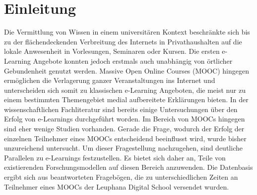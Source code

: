 \section{Einleitung}
\label{sec:einleitung}

Die Vermittlung von Wissen in einem universitären Kontext beschränkte sich bis zu der flächendeckenden Verbreitung des Internets in Privathaushalten auf die lokale Anwesenheit in Vorlesungen, Seminaren oder Kursen. Die ersten e-Learning Angebote konnten jedoch erstmals auch unabhängig von örtlicher Gebundenheit genutzt werden. Massive Open Online Courses (MOOC) hingegen ermöglichen die Verlagerung ganzer Veranstaltungen ins Internet und unterscheiden sich somit zu klassischen e-Learning Angeboten, die meist nur zu einem bestimmten Themengebiet medial aufbereitete Erklärungen bieten.
\newline
In der wissenschaftlichen Fachliteratur sind bereits einige Untersuchungen über den Erfolg von e-Learnings durchgeführt worden. Im Bereich von MOOCs hingegen sind eher wenige Studien vorhanden. Gerade die Frage, wodurch der Erfolg der einzelnen Teilnehmer eines MOOCs entscheidend beeinflusst wird, wurde bisher unzureichend untersucht. Um dieser Fragestellung nachzugehen, sind deutliche Parallelen zu e-Learnings festzustellen. Es bietet sich daher an, Teile von existierenden Forschungsmodellen auf diesen Bereich anzuwenden. Die Datenbasis ergibt sich aus beantworteten Fragebögen, die zu unterschiedlichen Zeiten an Teilnehmer eines MOOCs der Leuphana Digital School versendet wurden. 